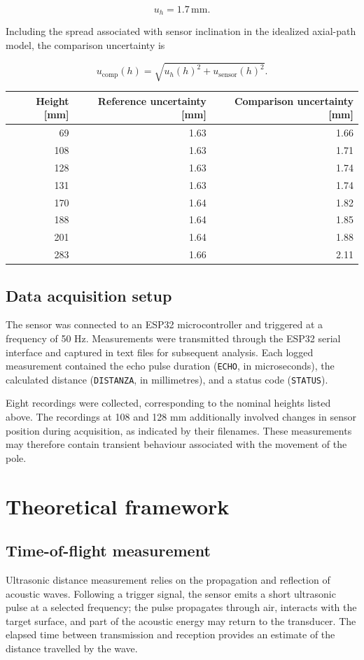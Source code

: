 \documentclass[11pt,a4paper]{article}
\begin{document}
\[
u_h=1.7\,\mathrm{mm}.
\]

Including the spread associated with sensor inclination in the idealized axial-path model, the comparison uncertainty is

\[
u_{\mathrm{comp}}(h)=
\sqrt{u_h(h)^2+u_{\mathrm{sensor}}(h)^2}.
\]

\begin{center}
\begin{tabular}{rrr}
Height [mm] & Reference uncertainty [mm] & Comparison uncertainty [mm]\\
\hline
69 & 1.63 & 1.66\\
108 & 1.63 & 1.71\\
128 & 1.63 & 1.74\\
131 & 1.63 & 1.74\\
170 & 1.64 & 1.82\\
188 & 1.64 & 1.85\\
201 & 1.64 & 1.88\\
283 & 1.66 & 2.11\\
\end{tabular}
\end{center}
\subsection{Data acquisition setup}
\label{sec:org1baac99}
The sensor was connected to an ESP32 microcontroller and triggered at a frequency of 50 Hz. Measurements were transmitted through the ESP32 serial interface and captured in text files for subsequent analysis.  Each logged measurement contained the echo pulse duration (\texttt{ECHO}, in microseconds), the calculated distance (\texttt{DISTANZA}, in millimetres), and a status code (\texttt{STATUS}).

Eight recordings were collected, corresponding to the nominal heights listed above. The recordings at 108 and 128 mm additionally involved changes in sensor position during acquisition, as indicated by their filenames. These measurements may therefore contain transient behaviour associated with the movement of the pole.
\section{Theoretical framework}
\label{sec:orgdb231d6}
\subsection{Time-of-flight measurement}
\label{sec:org5a4b4ba}
Ultrasonic distance measurement relies on the propagation and reflection of acoustic waves. Following a trigger signal, the sensor emits a short ultrasonic pulse at a selected frequency; the pulse propagates through air, interacts with the target surface, and part of the acoustic energy may return to the transducer. The elapsed time between transmission and reception provides an estimate of the distance travelled by the wave.
\end{document}
